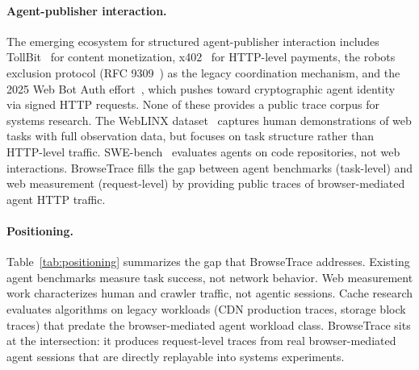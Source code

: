\documentclass[10pt,sigconf,letterpaper,anonymous,nonacm]{acmart}
\newcommand{\sysname}{Browse\-Trace\xspace}
\begin{document}
\paragraph{Agent-publisher interaction.}
The emerging ecosystem for structured agent-publisher interaction
includes TollBit~\cite{tollbit2024} for content monetization,
x402~\cite{x402} for HTTP-level payments, the robots exclusion
protocol (RFC 9309~\cite{robotstxt}) as the legacy coordination
mechanism, and the 2025 Web Bot Auth
effort~\cite{cloudflare2025signedagents,ietf2025webbotauth}, which
pushes toward cryptographic agent identity via signed HTTP requests.
None of these provides a public trace corpus for systems research.  The WebLINX dataset~\cite{weblinx} captures human
demonstrations of web tasks with full observation data, but focuses
on task structure rather than HTTP-level traffic.  SWE-bench~\cite{swebench}
evaluates agents on code repositories, not web interactions.
\sysname fills the gap between agent benchmarks (task-level) and
web measurement (request-level) by providing public traces of
browser-mediated agent HTTP traffic.

\paragraph{Positioning.}
Table~\ref{tab:positioning} summarizes the gap that \sysname addresses.
Existing agent benchmarks measure task success, not network behavior.
Web measurement work characterizes human and crawler traffic, not
agentic sessions.  Cache research evaluates algorithms on legacy
workloads (CDN production traces, storage block traces) that predate
the browser-mediated agent workload class.  \sysname sits at the
intersection: it produces request-level traces from real
browser-mediated agent sessions that are directly replayable into
systems experiments.
\end{document}
